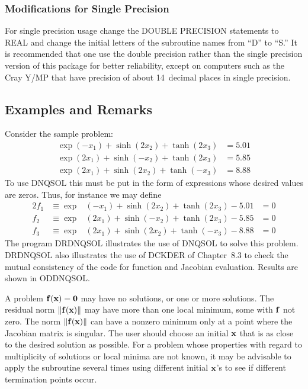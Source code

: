 \documentclass[twoside]{MATH77}
\begin{document}
\subsubsection{Modifications for Single Precision}

For single precision usage change the DOUBLE PRECISION statements to REAL
and change the initial letters of the subroutine names from ``D'' to ``S.''
It is recommended that one use the double precision rather than the
single precision version of this
package for better reliability, except on computers such as the Cray Y/MP
that have precision of about 14~decimal places in single precision.

\subsection{Examples and Remarks}

Consider the sample problem:%
\begin{align*}
\exp (-x_1)+\sinh(2x_2)+\tanh(2x_3) &= 5.01\\
\exp (2x_1)+\sinh(-x_2)+\tanh(2x_3) &= 5.85\\
\exp (2x_1)+\sinh(2x_2)+\tanh(-x_3) &= 8.88
\end{align*}
To use DNQSOL this must be put in the form of expressions whose desired
values are zeros. Thus, for instance we may define%
\begin{alignat*}{2}
f_1 &\equiv \exp &(-x_1)+\sinh(2x_2)+\tanh(2x_3)-5.01&=0\\
f_2 &\equiv \exp &(2x_1)+\sinh(-x_2)+\tanh(2x_3)-5.85&=0\\
f_3 &\equiv \exp &(2x_1)+\sinh(2x_2)+\tanh(-x_3)-8.88&=0
\end{alignat*}
The program DRDNQSOL illustrates the use of DNQSOL to solve this problem.
DRDNQSOL also illustrates the use of DCKDER of Chapter~8.3 to check the
mutual consistency of the code for function and Jacobian evaluation. Results
are shown in ODDNQSOL.

A problem ${\bf f}({\bf x}) = {\bf 0}$ may have no solutions, or one or more
solutions. The residual norm $\|{\bf f}({\bf x})\|$ may have more than one
local minimum, some with ${\bf f}$ not zero. The norm $\|{\bf f}({\bf x})\|$
can have a nonzero minimum only at a point where the Jacobian matrix is
singular. The user should choose an initial ${\bf x}$ that is as close to
the desired solution as possible. For a problem whose properties with regard
to multiplicity of solutions or local minima are not known, it may be
advisable to apply the subroutine several times using different initial $%
{\bf x}$'s to see if different termination points occur.
\end{document}
